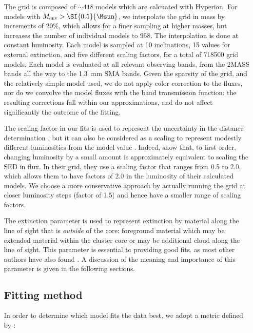 The grid is composed of $\sim 418$ models which are calcuated with Hyperion. For models with $\Menv>\SI{0.5}{\Msun}$, we interpolate the grid in mass by increments of 20\%, which allows for a finer sampling at higher masses, but increases the number of individual models to $958$. The interpolation is done at constant luminosity. Each model is sampled at 10 inclinations, 15 values for external extinction, and five different scaling factors, for a total of \num{718500} grid models. Each model is evaluated at all relevant observing bands, from the 2MASS bands all the way to the \SI{1.3}{\milli\meter} SMA bands. Given the sparsity of the grid, and the relatively simple model used, we do not apply color correction to the fluxes, nor do we convolve the model fluxes with the band transmission function: the resulting corrections fall within our approximations, and do not affect significantly the outcome of the fitting.

The scaling factor in our fits is used to represent the uncertainty in the distance determination \citep[e.g.][]{Robitaille:2006cb}, but it can also be considered as a scaling to represent modestly different luminosities from the model value \citep{Furlan:2016df}. Indeed, \citet{Furlan:2016df} show that, to first order, changing luminosity by a small amount is approximately equivalent to scaling the SED in flux. In their grid, they use a scaling factor that ranges from 0.5 to 2.0, which allows them to have factors of 2.0 in the luminosity of their calculated models. We choose a more conservative approach  by actually running the grid at closer luminosity steps (factor of 1.5) and hence have a smaller range of scaling factors. 

The extinction parameter is used to represent extinction by material along the line of sight that is \textit{outside} of the core: foreground material which may be extended material within the cluster core or may be additional cloud along the line of sight. This parameter is essential to providing good fits, as most other authors have also found \citep[e.g.][]{Robitaille:2006cb,Furlan:2016df}. A discussion of the meaning and importance of this parameter is given in the following sections.

\subsection{Fitting method}
\label{subsec:fittingmethod}

In order to determine which model fits the data best, we adopt a metric defined by \citet{Fischer:2012dj,Furlan:2016df}:

